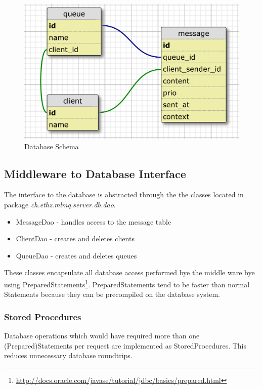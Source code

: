 \documentclass[a4paper]{article}
\begin{document}

\begin{figure}[H]
	\begin{center}
    \includegraphics[scale=0.3]{../drawings/database-schema.png}
  \end{center}
  \caption{Database Schema}
  \label{fig:dbschema}
\end{figure}



\subsection{Middleware to Database Interface}

The interface to the database is abstracted through the the classes located in package \textit{ch.ethz.mlmq.server.db.dao}.

\begin{itemize}
\item MessageDao - handles access to the message table
\item ClientDao - creates and deletes clients
\item QueueDao - creates and deletes queues
\end{itemize}

These classes encapsulate all database access performed bye the middle ware bye using PreparedStatements\footnote{\url{http://docs.oracle.com/javase/tutorial/jdbc/basics/prepared.html}}. PreparedStatements tend to be faster than normal Statements because they can be precompiled on the database system.

\subsubsection{Stored Procedures}
Database operations which would have required more than one (Prepared)Statements per request are implemented as StoredProcedures. This reduces unnecessary database roundtrips.
\end{document}
